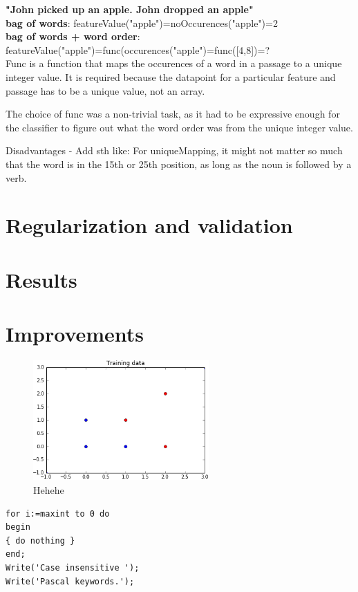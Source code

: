 \documentclass[a4paper]{article}
\numberwithin{equation}{section}
\begin{document}
\noindent \textbf{"John picked up an apple. John dropped an apple"} \\
\textbf{bag of words}: featureValue("apple")=noOccurences("apple")=2 \\
\textbf{bag of words + word order}: featureValue("apple")=func(occurences("apple")=func([4,8])=? \\

Func is a function that maps the occurences of a word in a passage to a unique integer value. It is required because the datapoint for a particular feature and passage has to be a unique value, not an array.

The choice of func was a non-trivial task, as it had to be expressive enough for the classifier to figure out what the word order was from the unique integer value.

Disadvantages - Add sth like:
For uniqueMapping, it might not matter so much that the word is in the 15th or 25th position, as long as the noun is followed by a verb.

\section{Regularization and validation}

\section{Results}

\section{Improvements}

\begin{figure}[h!]
	\centering
	\includegraphics[page=1,width=0.60\textwidth]{diagram.png}
	\caption{\label{fig:diagram}{Hehehe}}
\end{figure}

\begin{lstlisting}[frame=single]
for i:=maxint to 0 do
begin
{ do nothing }
end;
Write('Case insensitive ');
Write('Pascal keywords.');
\end{lstlisting}
\end{document}
